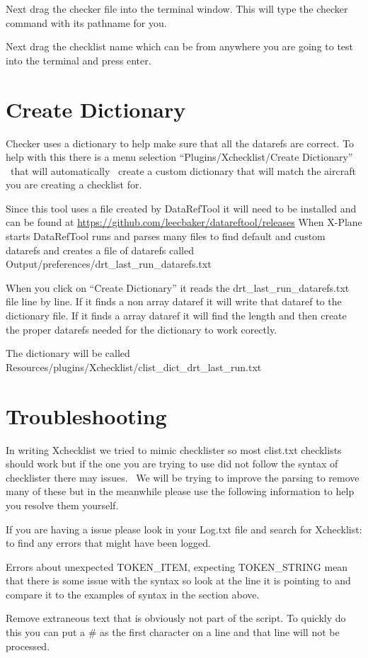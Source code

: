 \documentclass[11pt,parskip=half,a4paper]{scrartcl}
\begin{document}
Next drag the checker file into the terminal window. This will type the checker command with its pathname for you.

Next drag the checklist name which can be from anywhere you are going to test into the terminal and press enter.

\newpage
\section{Create Dictionary}


Checker uses a dictionary to help make sure that all the datarefs are correct. To help with this there is a menu
selection ``Plugins/Xchecklist/Create Dictionary'' \ that will automatically \ create a custom dictionary that will match the aircraft you are creating a checklist for.

Since this tool uses a file created by DataRefTool it will need to be installed and can be found at
\url{https://github.com/leecbaker/datareftool/releases} When X-Plane starts DataRefTool runs and parses many files to find default and custom datarefs and creates a file of datarefs called
Output/preferences/drt\_last\_run\_datarefs.txt

When you click on ``Create Dictionary'' it reads the drt\_last\_run\_datarefs.txt file line by line. If it finds a non array dataref it will write that dataref to the dictionary file. If it finds a array dataref it will find the length and then create the proper datarefs needed for the dictionary to work corectly. 

The dictionary will be called Resources/plugins/Xchecklist/clist\_dict\_drt\_last\_run.txt

\section{Troubleshooting}

In writing Xchecklist we tried to mimic checklister so most clist.txt checklists should work but if the one you are trying to use did not follow the syntax of checklister there may issues. \ We will be trying to improve the parsing to remove many of these but in the meanwhile please use the following information to help you resolve them yourself. \ 

If you are having a issue please look in your Log.txt file and search for Xchecklist: to find any errors that might have been logged.

Errors about {\textquotedbl}unexpected TOKEN\_ITEM, expecting TOKEN\_STRING{\textquotedbl} mean that there is some issue with the syntax so look at the line it is pointing to and compare it to the examples of syntax in the section above.

Remove extraneous text that is obviously not part of the script. To quickly do this you can put a \# as the first character on a line and that line will not be processed.
\end{document}
